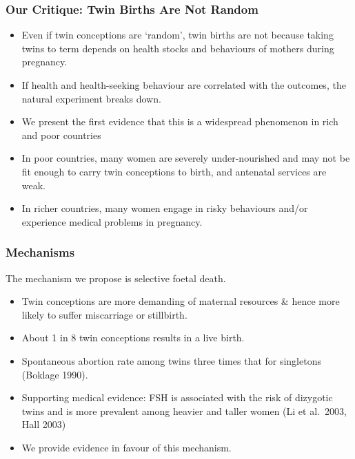 \documentclass[9pt,letterpaper,subeqn]{beamer}
\begin{document}
\begin{frame}
  \frametitle{Our Critique: Twin Births Are Not Random}
  \begin{itemize}
  \item Even if twin conceptions are `random', twin births are not because taking twins to term depends on health stocks and behaviours of mothers during pregnancy.
  \item If health and health-seeking behaviour are correlated with the outcomes, the natural experiment breaks down.\\ \vspace{5mm}
  \item We present the first evidence that this is a widespread phenomenon in rich and poor countries
  \item In poor countries, many women are severely under-nourished and may not be fit enough to carry twin conceptions to birth, and antenatal services are weak. 
  \item In richer countries, many women engage in risky behaviours and/or experience medical problems in pregnancy.
  \end{itemize}
\end{frame}



\begin{frame}[label=mech]
  \frametitle{Mechanisms}
  The mechanism we propose is selective foetal death. 
  \begin{itemize}
  \item Twin conceptions are more demanding of maternal resources \& hence more likely to suffer miscarriage or stillbirth.
  \item About 1 in 8 twin conceptions results in a live birth. 
	\item Spontaneous abortion rate among twins three times that for singletons (Boklage 1990). \\ \vspace{3mm}
  \item Supporting medical evidence: FSH is associated with the risk of dizygotic twins and is more prevalent among heavier and taller women (Li et al.\ 2003, Hall 2003) \\ \vspace{3mm}
  \item We provide evidence in favour of this mechanism.
\end{itemize}
\end{frame}
\end{document}
